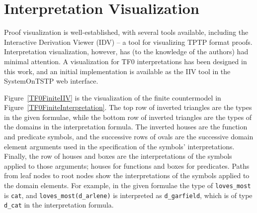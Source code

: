 \documentclass[letterpaper]{article}
\newcommand{\smalltt}[1]{\small \texttt{#1}}
\begin{document}
{%
\section{Interpretation Visualization}
\label{Visualization}

Proof visualization is well-established, with several tools available, including the Interactive 
Derivation Viewer (IDV) \cite{TPS07} -- a tool for visualizing TPTP format proofs.
Interpretation visualization, however, has (to the knowledge of the authors) had minimal 
attention.
% 
A visualization for TF0 interpretations has been designed in this work, and an initial
implementation is available as the IIV tool in the SystemOnTSTP web interface.

Figure~\ref{TF0FiniteIIV} is the visualization of the finite countermodel in 
Figure~\ref{TF0FiniteInterpretation}.
The top row of inverted triangles are the types in the given formulae,
while the bottom row of inverted triangles are the types of the domains in the interpretation
formula.
The inverted houses are the function and predicate symbols, and the successive rows of ovals are 
the successive domain element arguments used in the specification of the symbols' interpretations.
Finally, the row of houses and boxes are the interpretations of the symbols applied to those
arguments; houses for functions and boxes for predicates.
Paths from leaf nodes to root nodes show the interpretations of the symbols applied to the 
domain elements.
For example, in the given formulae the type of {\smalltt{loves\_most}} is {\smalltt{cat}},
and {\smalltt{loves\_most(d\_arlene)}} is interpreted as {\smalltt{d\_garfield}}, which is of type
{\smalltt{d\_cat}} in the interpretation formula.

}
\end{document}

